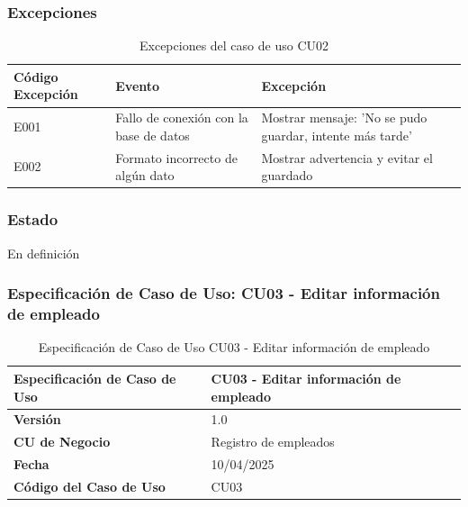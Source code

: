 \subsubsection*{Excepciones}
\begin{table}[h]
	\centering
	\caption{Excepciones del caso de uso CU02}
	\begin{tabular}{|p{3cm}|p{5cm}|p{5cm}|}
		\hline
		\textbf{Código Excepción} & \textbf{Evento}                        & \textbf{Excepción}                                       \\ \hline
		E001                      & Fallo de conexión con la base de datos & Mostrar mensaje: 'No se pudo guardar, intente más tarde' \\ \hline
		E002                      & Formato incorrecto de algún dato       & Mostrar advertencia y evitar el guardado                 \\ \hline
	\end{tabular}
\end{table}

\newpage

\subsubsection*{Estado}
En definición

\subsubsection*{Especificación de Caso de Uso: CU03 - Editar información de empleado}

\begin{table}[h]
	\centering
	\caption{Especificación de Caso de Uso CU03 - Editar información de empleado}
	\begin{tabular}{|p{5cm}|p{9cm}|}
		\hline
		\textbf{Especificación de Caso de Uso} & CU03 - Editar información de empleado \\ \hline
		\textbf{Versión}                       & 1.0                                   \\ \hline
		\textbf{CU de Negocio}                 & Registro de empleados                 \\ \hline
		\textbf{Fecha}                         & 10/04/2025                            \\ \hline
		\textbf{Código del Caso de Uso}        & CU03                                  \\ \hline
	\end{tabular}
\end{table}


